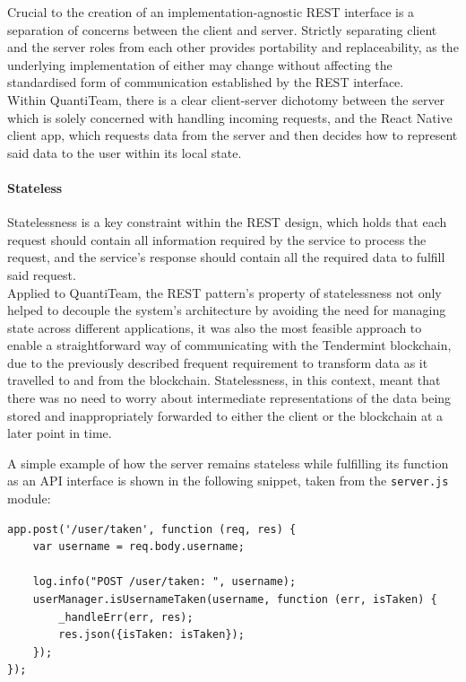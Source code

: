 Crucial to the creation of an implementation-agnostic REST interface is
a separation of concerns between the client and
server\cite{1rest}.
Strictly separating client and the server roles from each other provides
portability and replaceability, as the underlying implementation of
either may change without affecting the standardised form of
communication established by the REST interface.\\
Within QuantiTeam, there is a clear client-server dichotomy between the
server which is solely concerned with handling incoming requests, and
the React Native client app, which requests data from the server and
then decides how to represent said data to the user within its local
state.

\paragraph{Stateless}\label{stateless}

Statelessness is a key constraint within the REST design, which holds
that each request should contain all information required by the service
to process the request, and the service's response should contain all
the required data to fulfill said
request\cite{1rest}.\\
Applied to QuantiTeam, the REST pattern's property of statelessness not
only helped to decouple the system's architecture by avoiding the need
for managing state across different applications, it was also the most
feasible approach to enable a straightforward way of communicating with
the Tendermint blockchain, due to the previously described frequent
requirement to transform data as it travelled to and from the
blockchain. Statelessness, in this context, meant that there was no need
to worry about intermediate representations of the data being stored and
inappropriately forwarded to either the client or the blockchain at a
later point in time.

A simple example of how the server remains stateless while fulfilling
its function as an API interface is shown in the following snippet,
taken from the \texttt{server.js} module:

\begin{verbatim}
app.post('/user/taken', function (req, res) {
    var username = req.body.username;

    log.info("POST /user/taken: ", username);
    userManager.isUsernameTaken(username, function (err, isTaken) {
        _handleErr(err, res);
        res.json({isTaken: isTaken});
    });
});
\end{verbatim}

